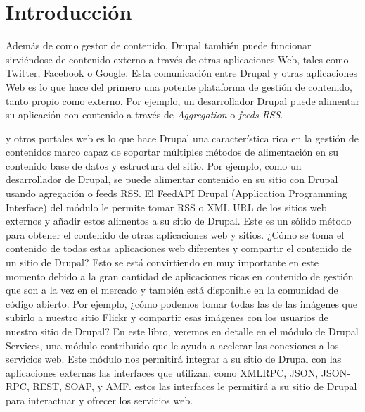 \chapter{Introducción}

Además de como gestor de contenido, Drupal también puede funcionar sirviéndose de contenido externo 
a través de otras aplicaciones Web, tales como Twitter, Facebook o Google. Esta comunicación entre 
Drupal y otras aplicaciones Web es lo que hace del primero una potente plataforma de gestión 
de contenido, tanto propio como externo. Por ejemplo, un desarrollador Drupal puede alimentar su aplicación
con contenido a través de \emph{Aggregation} o \emph{feeds RSS}. 

y otros portales web es lo que hace Drupal una característica rica en la gestión de contenidos
marco capaz de soportar múltiples métodos de alimentación en su contenido
base de datos y estructura del sitio. Por ejemplo, como un desarrollador de Drupal, se puede alimentar
contenido en su sitio con Drupal usando agregación o feeds RSS. El FeedAPI Drupal
(Application Programming Interface) del módulo le permite tomar RSS o XML URL
de los sitios web externos y añadir estos alimentos a su sitio de Drupal. Este es un sólido
método para obtener el contenido de otras aplicaciones web y sitios.
¿Cómo se toma el contenido de todas estas aplicaciones web diferentes y compartir
el contenido de un sitio de Drupal? Esto se está convirtiendo en muy importante en este momento debido a la
gran cantidad de aplicaciones ricas en contenido de gestión que son a la vez en el mercado y
también está disponible en la comunidad de código abierto. Por ejemplo, ¿cómo podemos tomar todas las
de las imágenes que subirlo a nuestro sitio Flickr y compartir esas imágenes con los usuarios de
nuestro sitio de Drupal? En este libro, veremos en detalle en el módulo de Drupal Services, una
módulo contribuido que le ayuda a acelerar las conexiones a los servicios web.
Este módulo nos permitirá integrar a su sitio de Drupal con las aplicaciones externas
las interfaces que utilizan, como XMLRPC, JSON, JSON-RPC, REST, SOAP, y AMF. estos
las interfaces le permitirá a su sitio de Drupal para interactuar y ofrecer los servicios web.
